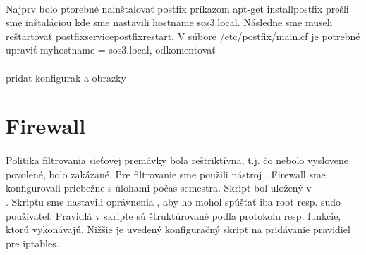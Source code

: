 \paragraph{}
Najprv bolo ptorebné nainštalovať postfix príkazom apt-get installpostfix prešli sme inštaláciou kde sme nastavili hostname sos3.local. Následne sme museli reštar\-tovať postfixservicepostfixrestart. V súbore /etc/postfix/main.cf je potrebné upraviť myhostname = sos3.local, odkomentovať\\
\paragraph{}
pridat konfigurak a obrazky

\section{Firewall}
\paragraph{}
Politika filtrovania sieťovej premávky bola reštriktívna, t.j. čo nebolo vyslovene povolené, bolo zakázané. Pre filtrovanie sme použili nástroj . Firewall sme konfigurovali priebežne s úlohami počas semestra. Skript bol uložený v\\ . Skriptu sme nastavili oprávnenia , aby ho mohol spúšťať iba root resp. sudo používateľ. Pravidlá v skripte sú štruktúro\-vané podľa protokolu resp. funkcie, ktorú vykonávajú. Nižšie je uvedený konfiguračný skript na pridávanie pravidiel pre iptables.

